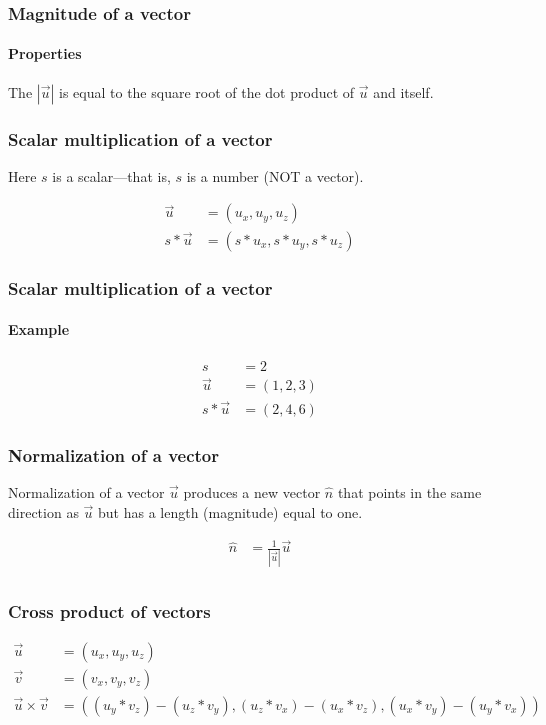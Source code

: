 \documentclass[xcolor=dvipsnames]{beamer}
\begin{document}
\begin{frame}
\frametitle{Magnitude of a vector}
\framesubtitle{Properties}

  The $|\vec{u}|$ is equal to the square root of the dot product of $\vec{u}$ and itself.

  \end{frame}

\begin{frame}
\frametitle{Scalar multiplication of a vector}

  Here $s$ is a scalar---that is, $s$ is a number (NOT a vector).

  \begin{align*}
    \vec{u} & = (u_x, u_y, u_z) \\
    s * \vec{u} & = (s*u_x, s*u_y, s*u_z) 
    \end{align*}
  \end{frame}

\begin{frame}
\frametitle{Scalar multiplication of a vector}
\framesubtitle{Example}

  \begin{align*}
    s & = 2 \\
    \vec{u} & = (1, 2, 3) \\
    s * \vec{u} & = (2, 4, 6) 
    \end{align*}
  \end{frame}

\begin{frame}
\frametitle{Normalization of a vector}

  Normalization of a vector $\vec{u}$ produces
  a new vector $\hat{n}$ that points in the same
  direction as $\vec{u}$ but has a length (magnitude)
  equal to one.

  \begin{align*}
    \hat{n} & = \frac{1}{|\vec{u}|} \vec{u} \\
    \end{align*}

  \end{frame}

\begin{frame}
\frametitle{Cross product of vectors}
  \begin{align*}
    \vec{u} & = (u_x, u_y, u_z) \\
    \vec{v} & = (v_x, v_y, v_z) \\
    \vec{u} \times \vec{v} & = ((u_y * v_z) - (u_z * v_y), (u_z * v_x) - (u_x * v_z), (u_x * v_y) - (u_y * v_x))
    \end{align*}
  \end{frame}
\end{document}

